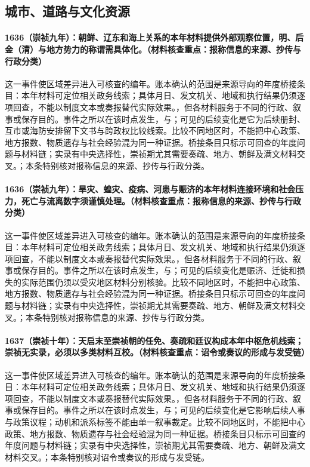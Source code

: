\subsection{城市、道路与文化资源}

\paragraph{1636（崇祯九年）：朝鲜、辽东和海上关系的本年材料提供外部观察位置，明、后金（清）与地方势力的称谓需具体化。（材料核查重点：报称信息的来源、抄传与行政分类）} 这一事件使区域差异进入可核查的编年。账本确认的范围是来源导向的年度桥接条目：本年材料可定位相关政务线索；具体月日、发文机关、地域和执行结果仍须逐项回查，不能以制度文本或奏报替代实际效果。，但各材料服务于不同的行政、叙事或保存目的。事件之所以在该时点发生，与；可见的后续变化是它为后续册封、互市或海防安排留下文书与跨政权比较线索。比较不同地区时，不能把中心政策、地方报数、物质遗存与社会经验混为同一种证据。桥接条目只标示可回查的年度问题与材料链；实录有中央选择性，崇祯期尤其需要奏疏、地方、朝鲜及满文材料交叉。；本条特别核对报称信息的来源、抄传与行政分类。

\paragraph{1636（崇祯九年）：旱灾、蝗灾、疫病、河患与赈济的本年材料连接环境和社会压力，死亡与流离数字须谨慎处理。（材料核查重点：报称信息的来源、抄传与行政分类）} 这一事件使区域差异进入可核查的编年。账本确认的范围是来源导向的年度桥接条目：本年材料可定位相关政务线索；具体月日、发文机关、地域和执行结果仍须逐项回查，不能以制度文本或奏报替代实际效果。，但各材料服务于不同的行政、叙事或保存目的。事件之所以在该时点发生，与；可见的后续变化是赈济、迁徙和损失的实际范围仍须以受灾地区材料分别核验。比较不同地区时，不能把中心政策、地方报数、物质遗存与社会经验混为同一种证据。桥接条目只标示可回查的年度问题与材料链；实录有中央选择性，崇祯期尤其需要奏疏、地方、朝鲜及满文材料交叉。；本条特别核对报称信息的来源、抄传与行政分类。

\paragraph{1637（崇祯十年）：天启末至崇祯朝的任免、奏疏和廷议构成本年中枢危机线索；崇祯无实录，必须以多类材料互校。（材料核查重点：诏令或奏议的形成与发受链）} 这一事件使区域差异进入可核查的编年。账本确认的范围是来源导向的年度桥接条目：本年材料可定位相关政务线索；具体月日、发文机关、地域和执行结果仍须逐项回查，不能以制度文本或奏报替代实际效果。，但各材料服务于不同的行政、叙事或保存目的。事件之所以在该时点发生，与；可见的后续变化是它影响后续人事与政策议程；动机和派系标签不能由单一叙事裁定。比较不同地区时，不能把中心政策、地方报数、物质遗存与社会经验混为同一种证据。桥接条目只标示可回查的年度问题与材料链；实录有中央选择性，崇祯期尤其需要奏疏、地方、朝鲜及满文材料交叉。；本条特别核对诏令或奏议的形成与发受链。

